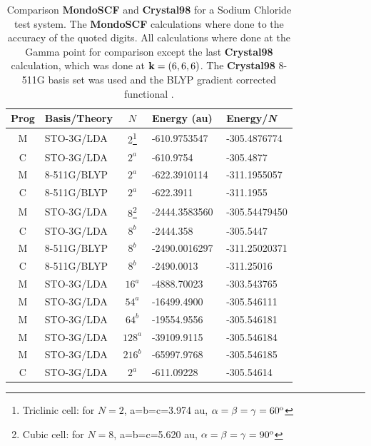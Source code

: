 \documentclass[prb,aps,nobibnotes,twocolumn,doublespace,twocolumngrid,superbib]{revtex4}
\begin{document}
\begin{table}
\caption{Comparison \textbf{MondoSCF} and \textbf{Crystal98} for a 
Sodium Chloride test system. The \textbf{MondoSCF} calculations where done to
the accuracy of the quoted digits. All calculations where done at the Gamma point
for comparison except the last \textbf{Crystal98} calculation, which was done at ${\bf k}=(6,6,6)$.
The \textbf{Crystal98} 8-511G  basis set was used \cite{C98Basis} and the BLYP gradient corrected 
functional \cite{Becke93}.}
\label{table:ComToCrystal98_1}
 
\begin{tabular}{clcll}
\hline 
Prog&
Basis/Theory&
\( N \)&
Energy  (au)&
Energy/{\it N}\\
\hline
\hline 
M &
STO-3G/LDA&
2\footnote[1]{Triclinic cell: for $N=2$, a=b=c=3.974 au, $\alpha=\beta=\gamma=60^{{\rm o}}$}&
-610.9753547&
-305.4876774\\
C&
STO-3G/LDA&
$2^a$&
-610.9754&
-305.4877\\
M&
8-511G/BLYP&
$2^a$&
-622.3910114&
-311.1955057\\
C&
8-511G/BLYP&
$2^a$&
-622.3911&
-311.1955\\
\hline 
M&
STO-3G/LDA&
8\footnote[2]{Cubic cell: for $N=8$, a=b=c=5.620 au, $\alpha=\beta=\gamma=90^{{\rm o}}$}&
-2444.3583560&
-305.54479450\\
C&
STO-3G/LDA&
$8^b$&
-2444.358&
-305.5447\\
M&
8-511G/BLYP&
$8^b$&
-2490.0016297&
-311.25020371\\
C&
8-511G/BLYP&
$8^b$&
-2490.0013&
-311.25016 \\
\hline 
M&
STO-3G/LDA&
$16^a$&
-4888.70023&
-303.543765\\
M&
STO-3G/LDA&
$54^a$&
-16499.4900&
-305.546111\\
M&
STO-3G/LDA&
$64^b$&
-19554.9556&
-305.546181\\
M&
STO-3G/LDA&
$128^a$&
-39109.9115&
-305.546184\\
M&
STO-3G/LDA&
$216^b$ &
-65997.9768&
-305.546185\\
\hline
\,\,C\,\,&
STO-3G/LDA\,\,&
\,\,$2^a$\,\,&
-611.09228\,\,\,\,\,\,\,\,\,\,\,&
-305.54614\\
\hline
\end{tabular}
\end{table}
%
%
%
\end{document}
